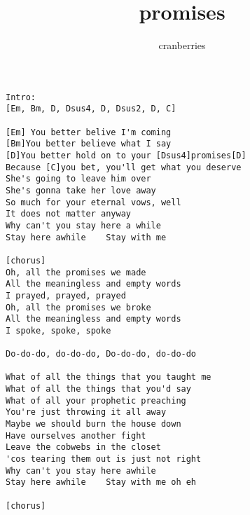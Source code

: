 \author{cranberries}
\title{promises}
\maketitle
\begin{verbatim}
Intro:
[Em, Bm, D, Dsus4, D, Dsus2, D, C]

[Em] You better belive I'm coming
[Bm]You better believe what I say
[D]You better hold on to your [Dsus4]promises[D]
Because [C]you bet, you'll get what you deserve
She's going to leave him over
She's gonna take her love away
So much for your eternal vows, well
It does not matter anyway
Why can't you stay here a while
Stay here awhile    Stay with me

[chorus]
Oh, all the promises we made
All the meaningless and empty words
I prayed, prayed, prayed
Oh, all the promises we broke
All the meaningless and empty words
I spoke, spoke, spoke

Do-do-do, do-do-do, Do-do-do, do-do-do

What of all the things that you taught me
What of all the things that you'd say
What of all your prophetic preaching
You're just throwing it all away
Maybe we should burn the house down
Have ourselves another fight
Leave the cobwebs in the closet
'cos tearing them out is just not right
Why can't you stay here awhile
Stay here awhile    Stay with me oh eh

[chorus]
\end{verbatim}
